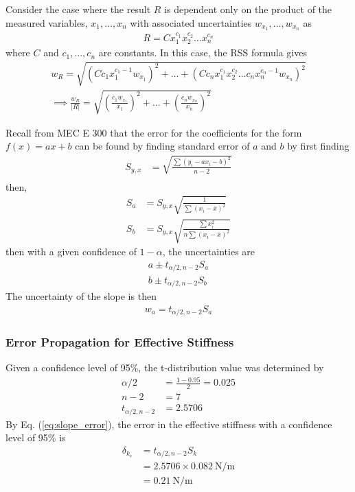 Consider the case where the result $R$ is dependent only on the product of the measured variables, $x_1, \ldots, x_n$ with associated uncertainties $w_{x_1}, \ldots, w_{x_n}$ as 
\begin{align*}
    R = C x_{1}^{c_1} x_{2}^{c_2} \ldots x_{n}^{c_n}
\end{align*}
where $C$ and $c_1, \ldots, c_n$ are constants. In this case, the RSS formula gives
\begin{align}
    w_{R} = \sqrt{\left(C c_1 x_{1}^{c_1 - 1} w_{x_1}\right)^2 + \ldots + \left(C c_n x_{1}^{c_1} x_{2}^{c_2} \ldots c_n x_{n}^{c_n - 1} w_{x_n}\right)^2} \nonumber \\
    \implies \frac{w_{R}}{|R|} = \sqrt{\left(\frac{c_1 w_{x_1}}{x_1}\right)^2 + \ldots + \left(\frac{c_n w_{x_n}}{x_n}\right)^2} \label{eq:error_propagation_pure_multiplicative}
\end{align}

Recall from MEC E 300 that the error for the coefficients for the form $f(x) = ax +b$ can be found by finding standard error of $a$ and $b$ by first finding 
\begin{align*}
    S_{y,x} &= \sqrt{\frac{\sum (y_i - a x_i - b)^2}{n-2}} \\
\end{align*}
then,
\begin{align*}
    S_a &= S_{y,x} \sqrt{\frac{1}{\sum (x_i - \bar{x})^2}} \\
    S_b &= S_{y,x} \sqrt{\frac{\sum x_i^2}{n \sum (x_i - \bar{x})^2}}
\end{align*}
then with a given confidence of $1 - \alpha$, the uncertainties are 
\begin{align*}
    a \pm t_{\alpha/2, n-2} S_a \\
    b \pm t_{\alpha/2, n-2} S_b
\end{align*}
The uncertainty of the slope is then \cite{wheeler_ganji}
\begin{align}
    w_a = t_{\alpha/2, n-2} S_a \label{eq:slope_error}
\end{align}

\subsubsection{Error Propagation for Effective Stiffness}
Given a confidence level of 95\%, the t-distribution value was determined by
\begin{align*}
    \alpha/2 &= \frac{1 - 0.95}{2} = 0.025 \\
    n - 2 &= 7 \\
    t_{\alpha/2, n-2} &= 2.5706
\end{align*}
By Eq. (\ref{eq:slope_error}), the error in the effective stiffness with a confidence level of 95\% is
\begin{align*}
    \delta_{k_e} &= t_{\alpha/2, n-2} S_k \\
    &= 2.5706 \times \qty{0.082}{\newton\per\meter} \\
    &= \boxed{\qty{0.21}{\newton\per\meter}}
\end{align*}



